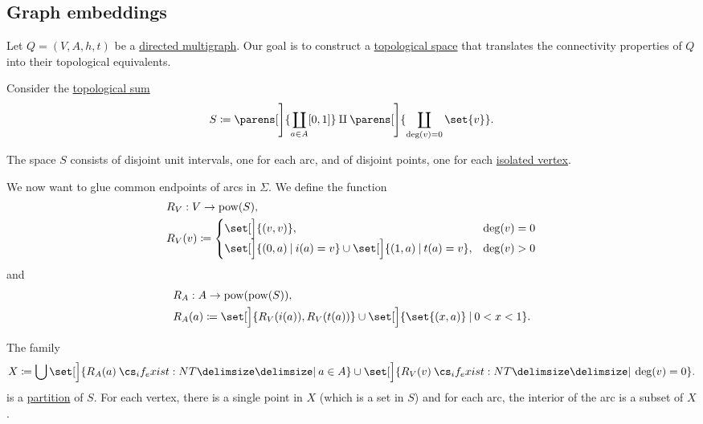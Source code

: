 \subsection{Graph embeddings}\label{subsec:graph_embeddings}

\begin{definition}\label{def:directed_multigraph_geometric_realization}
  Let \( Q = (V, A, h, t) \) be a \hyperref[def:directed_multigraph]{directed multigraph}. Our goal is to construct a \hyperref[def:topological_space]{topological space} that translates the connectivity properties of \( Q \) into their topological equivalents.

  Consider the \hyperref[def:topological_sum]{topological sum}
  \begin{equation*}
    S \coloneqq \parens[\Bigg]{ \coprod_{a \in A} [0, 1] } \amalg \parens[\Bigg]{ \coprod_{\deg(v) = 0} \set{ v } }.
  \end{equation*}

  The space \( S \) consists of disjoint unit intervals, one for each arc, and of disjoint points, one for each \hyperref[def:hypergraph/degree]{isolated vertex}.

  We now want to glue common endpoints of arcs in \( \Sigma \). We define the function
  \begin{equation}\label{eq:def:directed_multigraph_geometric_realization/rv}
    \begin{aligned}
      &R_V: V \to \pow(S), \\
      &R_V(v) \coloneqq \begin{cases}
        \set[\Big]{ (v, v) },                                                           &\deg(v) = 0 \\
        \set[\Big]{ (0, a) \given i(a) = v } \cup \set[\Big]{ (1, a) \given t(a) = v }, &\deg(v) > 0
      \end{cases}
    \end{aligned}
  \end{equation}
  and
  \begin{equation}\label{eq:def:directed_multigraph_geometric_realization/ra}
    \begin{aligned}
      &R_A: A \to \pow(\pow(S)), \\
      &R_A(a) \coloneqq \set[\Big]{ R_V(i(a)), R_V(t(a)) } \cup \set[\Big]{ \set{ (x, a) } \given 0 < x < 1 }.
    \end{aligned}
  \end{equation}

  The family
  \begin{equation*}
    X \coloneqq \bigcup \set[\Big]{ R_A(a) \given* a \in A } \cup \set[\Big]{ R_V(v) \given* \deg(v) = 0 }.
  \end{equation*}
  is a \hyperref[def:set_partition]{partition} of \( S \). For each vertex, there is a single point in \( X \) (which is a set in \( S \)) and for each arc, the interior of the arc is a subset of \( X \).


\end{definition}
